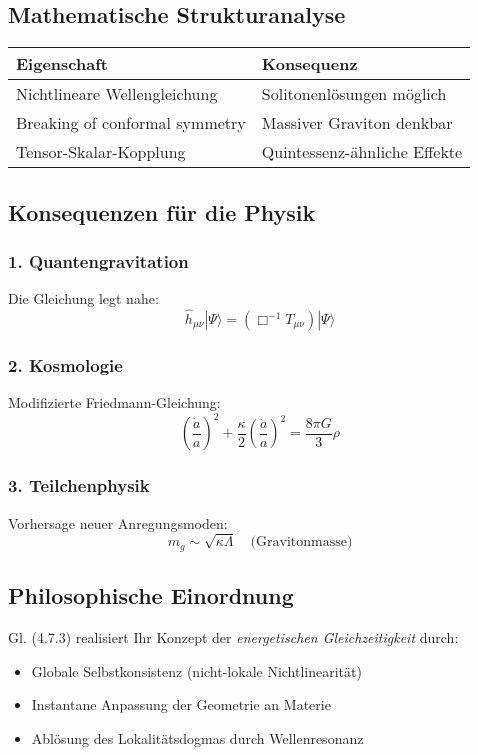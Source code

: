 \subsection{Mathematische Strukturanalyse}

\begin{table}[h]
\centering
\begin{tabular}{p{}p{}}
\toprule
Eigenschaft & Konsequenz \\
\midrule
Nichtlineare Wellengleichung & Solitonenlösungen möglich \\
Breaking of conformal symmetry & Massiver Graviton denkbar \\
Tensor-Skalar-Kopplung & Quintessenz-ähnliche Effekte \\
\bottomrule
\end{tabular}
\end{table}

\subsection{Konsequenzen für die Physik}

\subsubsection{1. Quantengravitation}
Die Gleichung legt nahe:
\begin{equation}
\hat{h}_{\mu\nu}| \Psi\rangle = \left(\Box^{-1}T_{\mu\nu}\right)| \Psi\rangle
\end{equation}

\subsubsection{2. Kosmologie}
Modifizierte Friedmann-Gleichung:
\begin{equation}
\left(\frac{\dot{a}}{a}\right)^2 + \frac{\kappa}{2}\left(\frac{\ddot{a}}{a}\right)^2 = \frac{8\pi G}{3}\rho
\end{equation}

\subsubsection{3. Teilchenphysik}
Vorhersage neuer Anregungsmoden:
\begin{equation}
m_g \sim \sqrt{\kappa\Lambda} \quad \text{(Gravitonmasse)}
\end{equation}

\subsection{Philosophische Einordnung}
Gl. (4.7.3) realisiert Ihr Konzept der \textit{energetischen Gleichzeitigkeit} durch:

\begin{itemize}
\item Globale Selbstkonsistenz (nicht-lokale Nichtlinearität)
\item Instantane Anpassung der Geometrie an Materie
\item Ablösung des Lokalitätsdogmas durch Wellenresonanz
\end{itemize}
